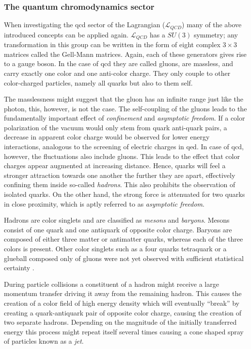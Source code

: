 \subsubsection{The quantum chromodynamics sector}
\label{sec:qcd}

When investigating the \gls{qcd} sector of the Lagrangian ($\mathcal{L}_{QCD}$) many of the above introduced concepts can be applied again. $\mathcal{L}_{QCD}$ has a $SU(3)$ symmetry; any transformation in this group can be written in the form of eight complex $3\times 3$ matrices called the Gell-Mann matrices. Again, each of these generators gives rise to a gauge boson. In the case of \gls{qcd} they are called gluons, are massless, and carry exactly one color and one anti-color charge. They only couple to other color-charged particles, namely all quarks but also to them self. 

The masslessness might suggest that the gluon has an infinite range just like the photon, this, however, is not the case. The self-coupling of the gluons leads to the fundamentally important effect of \emph{confinement} and \emph{asymptotic freedom}. If a color polarization of the vacuum would only stem from quark anti-quark pairs, a decrease in apparent color charge would be observed for lower energy interactions, analogous to the screening of electric charges in \gls{qed}. In case of \gls{qcd}, however, the fluctuations also include gluons. This leads to the effect that color charges appear augmented at increasing distance. Hence, quarks will feel a stronger attraction towards one another the further they are apart, effectively confining them inside so-called \emph{hadrons}. This also prohibits the observation of isolated quarks. On the other hand, the strong force is attenuated for two quarks in close proximity, which is aptly referred to as \emph{asymptotic freedom}.

Hadrons are color singlets and are classified as \emph{mesons} and \emph{baryons}. Mesons consist of one quark and one antiquark of opposite color charge. Baryons are composed of either three matter or antimatter quarks, whereas each of the three colors is present. Other color singlets such as a four quarks tetraquark or a glueball composed only of gluons were not yet observed with sufficient statistical certainty \cite{Ali2010,Cotugno2010}. 

During particle collisions a constituent of a hadron might receive a large momentum transfer driving it away from the remaining hadron. This causes the creation of a color field of high energy density which will eventually ``break'' by creating a quark-antiquark pair of opposite color charge, causing the creation of two separate hadrons. Depending on the magnitude of the initially transferred energy this process might repeat itself several times causing a cone shaped spray of particles known as a \emph{jet}.

